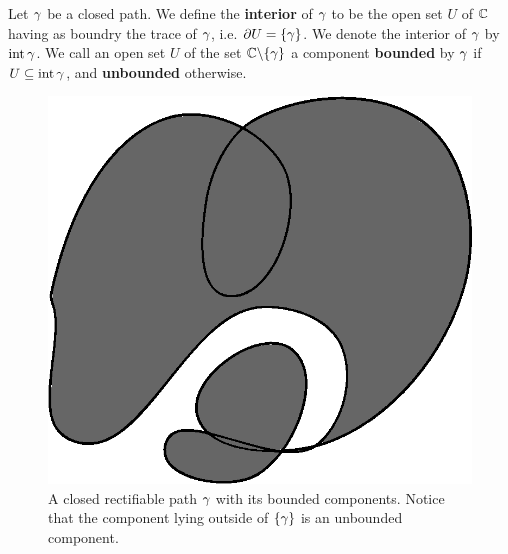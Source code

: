 \begin{definition}
    Let $\gamma$ be a closed path. We define the \textbf{interior} of $\gamma$ to be the
    open set  $U$ of $\mathbb{C}$ having as boundry the trace  of $\gamma$, i.e.
    $\partial{U}=\{\gamma\}$. We denote the interior of $\gamma$ by $\operatorname{int}{\gamma}$. We call
    an open set $U$ of the set $\mathbb{C} \backslash \{\gamma\}$ a component \textbf{bounded}
    by $\gamma$ if $U \subseteq \operatorname{int}{\gamma}$, and \textbf{unbounded} otherwise.
\end{definition}

\begin{figure}[h]
    \centering
    \includegraphics[scale=0.5]{Figures/Chapter4/bounded_components.eps}
    \caption{A closed rectifiable path $\gamma$ with its bounded components. Notice
    that the component lying outside of $\{\gamma\}$ is an unbounded component.}
    \label{fugure_4.2}
\end{figure}

